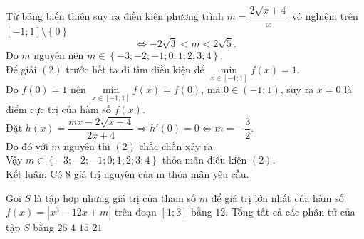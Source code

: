 \begin{ex}
{\begin{center}
		\end{center}
		Từ bảng biến thiên suy ra điều kiện phương trình $m=\dfrac{2\sqrt{x+4}}{x}$ vô nghiệm trên $[-1;1]\setminus \left\{ 0 \right\}$
		\[\Leftrightarrow -2\sqrt{3}<m<2\sqrt{5}.\]
		Do $m$ nguyên nên $m\in \left\{ -3;-2;-1;0;1;2;3;4 \right\}$.\\
		Để giải $(2)$ trước hết ta đi tìm điều kiện để $\min\limits_{x\in [-1;1]}f(x)=1$.\\
		Do $f(0)=1$ nên $\min\limits_{x\in [-1;1]}f(x)=f(0)$, mà $0\in \left( -1;1 \right)$, suy ra $x = 0$ là điểm cực trị của hàm số $f(x)$.\\
		Đặt $h(x)=\dfrac{mx-2\sqrt{x+4}}{2x+4}\Rightarrow h'(0)=0\Leftrightarrow m=-\dfrac{3}{2}$.\\
		Do đó với $m$ nguyên thì $(2)$ chắc chắn xảy ra.\\
		Vậy $m\in \left\{ -3;-2;-1;0;1;2;3;4 \right\}$ thỏa mãn điều kiện $(2)$.\\
		Kết luận: Có $8$ giá trị nguyên của m thỏa mãn yêu cầu.}
\end{ex}

\begin{ex}%
	Gọi $S$ là tập hợp những giá trị của tham số $m$ để giá trị lớn nhất của hàm số $f(x)=\left| {x^3}-12x+m \right|$ trên đoạn $[1;3]$ bằng $12$. Tổng tất cả các phần tử của tập $S$ bằng
	\choice
	{\True $25$}
	{$4$}
	{$15$}
	{$21$}
\end{ex}

